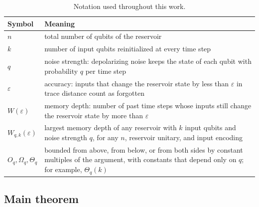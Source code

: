 \documentclass[aps,pra,reprint,superscriptaddress,floatfix]{revtex4-2}
\theoremstyle{plain}
\begin{document}
\begin{table}[b]
\caption{Notation used throughout this work.}
\label{tab:notation}
\begin{ruledtabular}
\begin{tabular}{p{1.75cm}p{5.85cm}}
{\centering Symbol\par} & {\raggedright Meaning\par} \\ \hline
{\centering $n$\par} & {\raggedright total number of qubits of the reservoir\par} \\
{\centering $k$\par} & {\raggedright number of input qubits reinitialized at every time step\par} \\
{\centering $q$\par} & {\raggedright noise strength: depolarizing noise keeps the state of each qubit with probability $q$ per time step\par} \\
{\centering $\varepsilon$\par} & {\raggedright accuracy: inputs that change the reservoir state by less than $\varepsilon$ in trace distance count as forgotten\par} \\
{\centering $W(\varepsilon)$\par} & {\raggedright memory depth: number of past time steps whose inputs still change the reservoir state by more than $\varepsilon$\par} \\
{\centering $W_{q,k}(\varepsilon)$\par} & {\raggedright largest memory depth of any reservoir with $k$ input qubits and noise strength $q$, for any $n$, reservoir unitary, and input encoding\par} \\
{\centering $O_q,\Omega_q,\Theta_q$\par} & {\raggedright bounded from above, from below, or from both sides by constant multiples of the argument, with constants that depend only on $q$; for example, $\Theta_q(k)$\par} \\
\end{tabular}
\end{ruledtabular}
\end{table}

\subsection{Main theorem}
\end{document}
